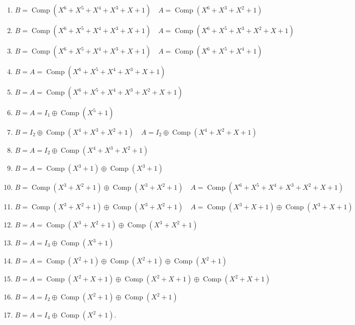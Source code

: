 \documentclass[10pt]{article}
\begin{document}
\begin{enumerate}
  \item $B=\operatorname{Comp}\left(X^{6}+X^{5}+X^{4}+X^{3}+X+1\right) \quad A=\operatorname{Comp}\left(X^{6}+X^{3}+X^{2}+1\right)$
  \item $B=\operatorname{Comp}\left(X^{6}+X^{5}+X^{4}+X^{3}+X+1\right) \quad A=\operatorname{Comp}\left(X^{6}+X^{5}+X^{3}+X^{2}+X+1\right)$
  \item $B=\operatorname{Comp}\left(X^{6}+X^{5}+X^{4}+X^{3}+X+1\right) \quad A=\operatorname{Comp}\left(X^{6}+X^{5}+X^{4}+1\right)$
  \item $B=A=\operatorname{Comp}\left(X^{6}+X^{5}+X^{4}+X^{3}+X+1\right)$
  \item $B=A=\operatorname{Comp}\left(X^{6}+X^{5}+X^{4}+X^{3}+X^{2}+X+1\right)$
  \item $B=A=I_{1} \oplus \operatorname{Comp}\left(X^{5}+1\right)$
  \item $B=I_{2} \oplus \operatorname{Comp}\left(X^{4}+X^{3}+X^{2}+1\right) \quad A=I_{2} \oplus \operatorname{Comp}\left(X^{4}+X^{2}+X+1\right)$
  \item $B=A=I_{2} \oplus \operatorname{Comp}\left(X^{4}+X^{3}+X^{2}+1\right)$
  \item $B=A=\operatorname{Comp}\left(X^{3}+1\right) \oplus \operatorname{Comp}\left(X^{3}+1\right)$
  \item $B=\operatorname{Comp}\left(X^{3}+X^{2}+1\right) \oplus \operatorname{Comp}\left(X^{3}+X^{2}+1\right) \quad A=\operatorname{Comp}\left(X^{6}+X^{5}+X^{4}+\right. \left.X^{3}+X^{2}+X+1\right)$
  \item $B=\operatorname{Comp}\left(X^{3}+X^{2}+1\right) \oplus \operatorname{Comp}\left(X^{3}+X^{2}+1\right) \quad A=\operatorname{Comp}\left(X^{3}+X+1\right) \oplus \operatorname{Comp}\left(X^{3}+X+1\right)$
  \item $B=A=\operatorname{Comp}\left(X^{3}+X^{2}+1\right) \oplus \operatorname{Comp}\left(X^{3}+X^{2}+1\right)$
  \item $B=A=I_{3} \oplus \operatorname{Comp}\left(X^{3}+1\right)$
  \item $B=A=\operatorname{Comp}\left(X^{2}+1\right) \oplus \operatorname{Comp}\left(X^{2}+1\right) \oplus \operatorname{Comp}\left(X^{2}+1\right)$
  \item $B=A=\operatorname{Comp}\left(X^{2}+X+1\right) \oplus \operatorname{Comp}\left(X^{2}+X+1\right) \oplus \operatorname{Comp}\left(X^{2}+X+1\right)$
  \item $B=A=I_{2} \oplus \operatorname{Comp}\left(X^{2}+1\right) \oplus \operatorname{Comp}\left(X^{2}+1\right)$
  \item $B=A=I_{4} \oplus \operatorname{Comp}\left(X^{2}+1\right)$.
\end{enumerate}
\end{document}
